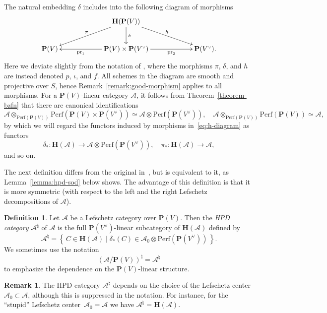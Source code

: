 \documentclass[11pt, reqno]{amsart}
\numberwithin{equation}{section}
\theoremstyle{plain}
\theoremstyle{definition}
\newtheorem{definition}[theorem]{Definition}
\newtheorem{remark}[theorem]{Remark}
\newcommand{\st}{\mid}
\newcommand{\set}[1]{\left\{ \, #1 \, \right\}}
\newcommand{\Perf}{\mathrm{Perf}}
\newcommand{\hpd}{{\natural}}
\newcommand{\svee}{\scriptscriptstyle\vee}
\newcommand{\cAd}{\cA^\hpd}
\newcommand{\sotimes}{\otimes}
\newcommand{\vV}{V^{\svee}}
\newcommand{\pr}{\mathrm{pr}}
\newcommand{\cA}{\mathcal{A}}
\newcommand{\bH}{\mathbf{H}}
\newcommand{\bP}{\mathbf{P}}
\begin{document}
The natural embedding $\delta$ includes into the following diagram of morphisms
\begin{equation}
\label{eq:h-diagram}
\vcenter{\xymatrix@C=6em{
& \bH(\bP(V)) \ar[dl]_\pi \ar[d]^\delta \ar[dr]^h 
\\
\bP(V) &
\bP(V) \times \bP(\vV) \ar[l]^-{\pr_1} \ar[r]_-{\pr_2} & 
\bP(\vV).
}}
\end{equation}
Here we deviate slightly from the notation of \cite{NCHPD}, where the morphisms $\pi$, $\delta$, 
and $h$ are instead denoted $p$, $\iota$, and $f$. 
All schemes in the diagram are smooth and projective over $S$, hence Remark~\ref{remark:good-morphism} applies to all morphisms.
For a $\bP(V)$-linear category $\cA$, 
it follows from Theorem~\ref{theorem-bzfn} that there are canonical identifications 
\begin{equation*} 
\cA \otimes_{\Perf(\bP(V))} \Perf(\bP(V) \times \bP(\vV)) \simeq 
\cA \sotimes \Perf(\bP(\vV)), 
\quad
\cA \otimes_{\Perf(\bP(V))} \Perf(\bP(V)) \simeq \cA, 
\end{equation*} 
by which we will regard the functors induced by morphisms in~\eqref{eq:h-diagram} as functors 
\begin{equation*}
\delta_* \colon \bH(\cA) \to \cA \sotimes \Perf(\bP(\vV)),
\quad 
\pi_* \colon \bH(\cA) \to \cA,
\end{equation*}
and so on.

The next definition differs from the original  
in~\cite{kuznetsov-hpd}, but is equivalent to it, as Lemma~\ref{lemma:hpd-sod} below shows. 
The advantage of this definition is that it is more symmetric 
(with respect to the left and the right Lefschetz decompositions of $\cA$). 

\begin{definition} 
\label{definition-HPD-category}
Let $\cA$ be a Lefschetz category over $\bP(V)$.
Then the \emph{HPD category} $\cAd$ of $\cA$ is the full $\bP(\vV)$-linear subcategory of 
$\bH(\cA)$ defined by 
\begin{equation} 
\label{eq:hpd-category}
\cAd = \set{ C \in \bH(\cA) \st \delta_*(C) \in \cA_0 \sotimes \Perf(\bP(\vV)) }.
\end{equation}
We sometimes use the notation 
\begin{equation*}
(\cA/\bP(V))^{\hpd}  = \cA^{\hpd}
\end{equation*}
to emphasize the dependence on the $\bP(V)$-linear structure. 
\end{definition}

\begin{remark}
The HPD category $\cAd$ depends on the choice of the Lefschetz center $\cA_0 \subset \cA$, 
although this is suppressed in the notation. 
For instance, for the ``stupid'' Lefschetz center~$\cA_0 = \cA$ we have $\cAd = \bH(\cA)$. 
\end{remark}
\end{document}
